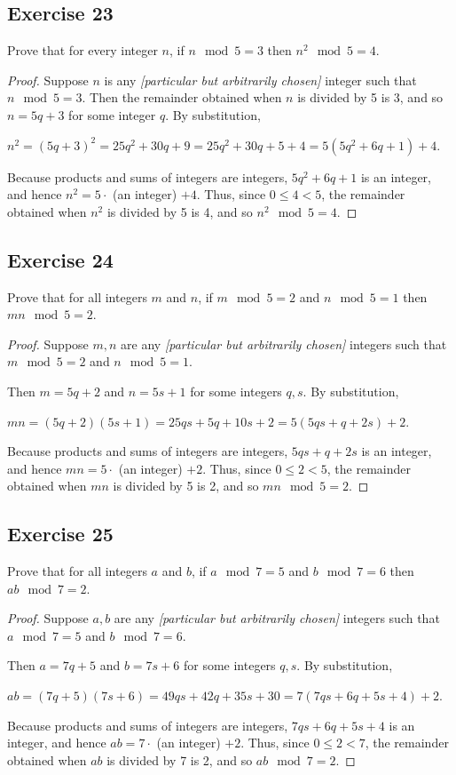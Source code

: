 \documentclass[14pt]{extarticle}
\begin{document}
\subsection{Exercise 23}
Prove that for every integer $n$, if $n \mod 5 = 3$ then
$n^2 \mod 5 = 4$.

\begin{proof}
Suppose $n$ is any {\it [particular but arbitrarily chosen]} integer such that $n \mod 5 = 3$. Then the remainder obtained when $n$ is divided by 5 is 3, and so $n = 5q + 3$ for some integer $q$. By substitution, 

$n^2 = (5q + 3)^2 = 25q^2 + 30q + 9 = 25q^2 + 30q + 5 + 4 = 5(5q^2 + 6q + 1) + 4$.

Because products and sums of integers are integers, $5q^2 + 6q + 1$ is an integer, and hence $n^2 = 5\cdot$ (an integer) $+ 4$. Thus, since $0 \leq 4 < 5$, the remainder obtained when $n^2$ is divided by 5 is 4, and so $n^2 \mod 5 = 4$.
\end{proof}

\subsection{Exercise 24}
Prove that for all integers $m$ and $n$, if $m \mod 5 = 2$
and $n \mod 5 = 1$ then $mn \mod 5 = 2$.

\begin{proof}
Suppose $m,n$ are any {\it [particular but arbitrarily chosen]} integers such that $m \mod 5 = 2$ and $n \mod 5 = 1$. 

Then $m = 5q + 2$ and $n = 5s + 1$ for some integers $q,s$. By substitution, 

$mn = (5q + 2)(5s+1) = 25qs + 5q + 10s + 2 = 5(5qs + q + 2s) + 2$.

Because products and sums of integers are integers, $5qs + q + 2s$ is an integer, and hence $mn = 5\cdot$ (an integer) $+ 2$. Thus, since $0 \leq 2 < 5$, the remainder obtained when $mn$ is divided by 5 is 2, and so $mn \mod 5 = 2$.
\end{proof}

\subsection{Exercise 25}
Prove that for all integers $a$ and $b$, if $a \mod 7 = 5$ and $b \mod 7 = 6$ then $ab \mod 7 = 2$.

\begin{proof}
Suppose $a,b$ are any {\it [particular but arbitrarily chosen]} integers such that $a \mod 7 = 5$ and $b \mod 7 = 6$. 

Then $a = 7q + 5$ and $b = 7s + 6$ for some integers $q,s$. By substitution, 

$ab = (7q + 5)(7s+6) = 49qs + 42q + 35s + 30 = 7(7qs + 6q + 5s + 4) + 2$.

Because products and sums of integers are integers, $7qs + 6q + 5s + 4$ is an integer, and hence $ab = 7\cdot$ (an integer) $+ 2$. Thus, since $0 \leq 2 < 7$, the remainder obtained when $ab$ is divided by 7 is 2, and so $ab \mod 7 = 2$.
\end{proof}
\end{document}
